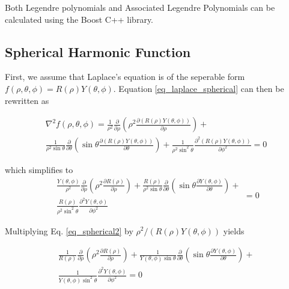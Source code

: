 \documentclass{article}
\numberwithin{equation}{subsection}
\begin{document}
Both Legendre polynomials and Associated Legendre Polynomials can be calculated using the Boost C++ library.

\subsection{Spherical Harmonic Function}

First, we assume that Laplace's equation is of the seperable form $f(\rho, \theta, \phi) = R(\rho)Y(\theta, \phi)$. Equation \ref{eq_laplace_spherical} can then be rewritten as

\begin{equation} \label{eq_spherical1}
\begin{split}
\nabla^2 f(\rho, \theta, \phi) = 
\frac{1}{\rho^2}
\frac{\partial}{\partial \rho} 
\left( \rho^2 \frac{\partial (R(\rho)Y(\theta, \phi))}{\partial \rho}\right) 
+ \\
\frac{1}{\rho^2 \sin \theta}
\frac{\partial}{\partial \theta}
\left( \sin \theta \frac{\partial (R(\rho)Y(\theta, \phi))}{\partial \theta}\right) 
+ 
\frac{1}{\rho^2 \sin^2 \theta} 
\frac{\partial^2 (R(\rho)Y(\theta, \phi))}{\partial \phi^2} = 0
\end{split}
\end{equation}

\noindent
which simplifies to
\begin{equation} \label{eq_spherical2}
\begin{split}
\frac{Y(\theta, \phi)}{\rho^2}
\frac{\partial}{\partial \rho} 
\left( \rho^2 \frac{\partial R(\rho)}{\partial \rho}\right) 
+ 
\frac{R(\rho)}{\rho^2 \sin \theta}
\frac{\partial}{\partial \theta}
\left( \sin \theta \frac{\partial Y(\theta, \phi)}{\partial \theta}\right) 
+ \\
\frac{R(\rho)}{\rho^2 \sin^2 \theta} 
\frac{\partial^2 Y(\theta, \phi)}{\partial \phi^2}
\end{split} = 0
\end{equation}

\noindent
Multiplying Eq. \ref{eq_spherical2} by $\rho^2 / (R(\rho)Y(\theta, \phi))$ yields

\begin{equation}\label{eq_spherical3}
\begin{split}
\frac{1}{R(\rho)}
\frac{\partial}{\partial \rho} 
\left( \rho^2 \frac{\partial R(\rho)}{\partial \rho}\right) 
+ 
\frac{1}{Y(\theta, \phi) \sin \theta}
\frac{\partial}{\partial \theta}
\left( \sin \theta \frac{\partial Y(\theta, \phi)}{\partial \theta}\right) 
+ \\
\frac{1}{Y(\theta, \phi) \sin^2 \theta} 
\frac{\partial^2 Y(\theta, \phi)}{\partial \phi^2} = 0
\end{split}
\end{equation}
\end{document}
